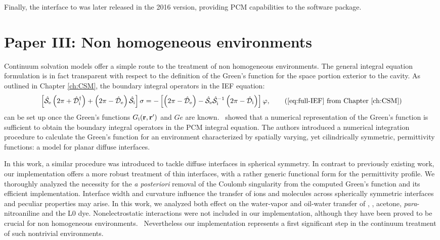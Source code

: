 Finally, the interface to \LSDALTON was later released in the 2016 version,
providing \acs{PCM} capabilities to the software package.

\section*{Paper III: Non homogeneous environments}

Continuum solvation models offer a simple route to the treatment of non
homogeneous environments.
The general integral equation formulation is in fact transparent with respect
to the definition of the Green's function for the space portion exterior to the
cavity.
As outlined in Chapter \ref{ch:CSM}, the boundary integral operators in the
\acs{IEF} equation:
\begin{equation}
  \left[ \bi{S}_\mathrm{e}\left(2\pi + \bi{D}^\dagger_\mathrm{i}\right)
  +
  \left(2\pi - \bi{D}_\mathrm{e}\right)\bi{S}_\mathrm{i}
  \right]\sigma =
  -\left[\left(2\pi-\bi{D}_\mathrm{e}\right)
  -\bi{S}_\mathrm{e}\bi{S}_\mathrm{i}^{-1}
  \left(2\pi-\bi{D}_\mathrm{i}\right)
  \right]\esp,
  \tag{\ref{eq:full-IEF} from Chapter \ref{ch:CSM}}
\end{equation}
can be set up once the Green's functions $G_\mathrm{i}(\mathbf{r}, \mathbf{r}^\prime)$ and $Ge$ are known.~\autocite{Cances1998-og}
\citeauthor{Frediani2004-er} showed that a numerical representation of the
Green's function is sufficient to obtain the boundary integral operators in the
\acs{PCM} integral equation.
The authors introduced a numerical integration procedure to calculate the
Green's function for an environment characterized by spatially varying, yet
cilindrically symmetric, permittivity functions: a model for planar diffuse interfaces.

In this work, a similar procedure was introduced to tackle diffuse interfaces
in spherical symmetry.
In contrast to previously existing work, our implementation offers a more robust
treatment of thin interfaces, with a rather generic functional form for the
permittivity profile.
We thoroughly analyzed the necessity for the \emph{a posteriori} removal of the
Coulomb singularity from the computed Green's function and its efficient
implementation.
Interface width and curvature influence the transfer of ions and molecules across
spherically symmetric interfaces and peculiar properties may arise.
In this work, we analyzed both effect on the water-vapor and oil-water transfer
of , , acetone, \emph{para}-nitroaniline and the L0 dye.
Nonelectrostatic interactions were not included in our implementation, although
they have been proved to be crucial for non homogeneous
environments.~\autocite{Mozgawa2014-ad}
Nevertheless our implementation represents a first significant step in the continuum treatment
of such nontrivial environments.

